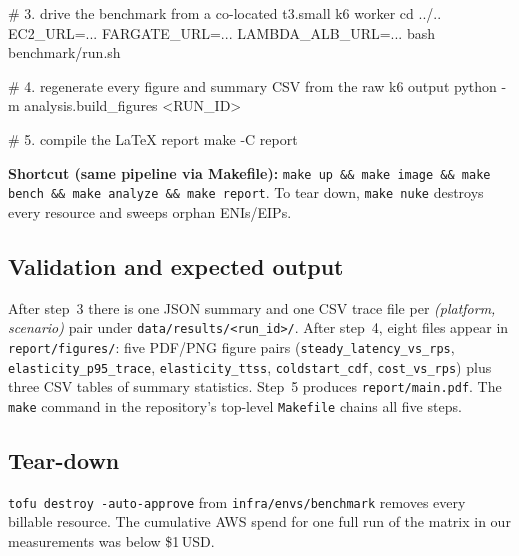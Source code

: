 \# 3. drive the benchmark from a co-located t3.small k6 worker
cd ../..
EC2\_URL=... FARGATE\_URL=... LAMBDA\_ALB\_URL=... bash benchmark/run.sh

\# 4. regenerate every figure and summary CSV from the raw k6 output
python -m analysis.build\_figures \textless{}RUN\_ID\textgreater{}

\# 5. compile the LaTeX report
make -C report
\endgroup

\medskip
\noindent\textbf{Shortcut (same pipeline via Makefile):} \texttt{make up \&\& make image \&\& make bench \&\& make analyze \&\& make report}. To tear down, \texttt{make nuke} destroys every resource and sweeps orphan ENIs/EIPs.

\subsection{Validation and expected output}
After step~3 there is one JSON summary and one CSV trace file per
\textit{(platform, scenario)} pair under
\texttt{data/results/<run\_id>/}. After step~4, eight files appear in
\texttt{report/figures/}: five PDF/PNG figure pairs
(\texttt{steady\_latency\_vs\_rps}, \texttt{elasticity\_p95\_trace},
\texttt{elasticity\_ttss}, \texttt{coldstart\_cdf}, \texttt{cost\_vs\_rps})
plus three CSV tables of summary statistics. Step~5 produces
\texttt{report/main.pdf}. The \texttt{make} command in the
repository's top-level \texttt{Makefile} chains all five steps.

\subsection{Tear-down}
\texttt{tofu destroy -auto-approve} from \texttt{infra/envs/benchmark}
removes every billable resource. The cumulative AWS spend for one
full run of the matrix in our measurements was below \$1\,USD.
